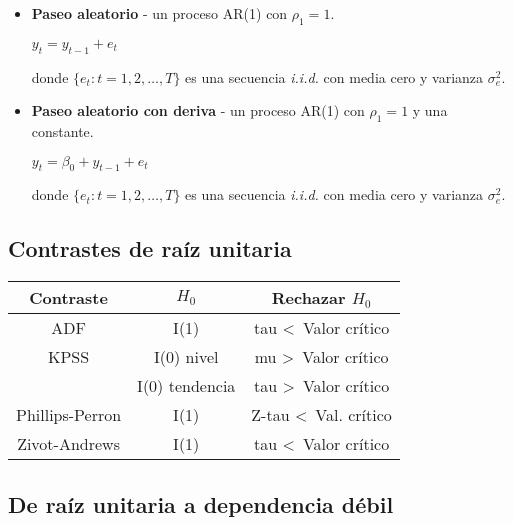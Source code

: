 \documentclass[10pt, a4paper, landscape]{article}
\begin{document}
\begin{multicols}{3}
		\begin{itemize}[leftmargin=*]
			\item \textbf{Paseo aleatorio} - un proceso AR(1) con $\rho_{1} = 1$.
			
			\begin{center}
				$y_{t} = y_{t - 1} + e_{t}$
			\end{center}
			
			donde $\lbrace e_{t} : t = 1, 2, \ldots, T \rbrace$ es una secuencia \textsl{i.i.d.} con media cero y varianza $\sigma^{2}_{e}$.
			
			\item \textbf{Paseo aleatorio con deriva} - un proceso AR(1) con $\rho_{1} = 1$ y una constante.
			
			\begin{center}
				$y_{t} = \beta_{0} + y_{t - 1} + e_{t}$
			\end{center}
			
			donde $\lbrace e_{t} : t = 1, 2, \ldots, T \rbrace$ es una secuencia \textsl{i.i.d.} con media cero y varianza $\sigma^{2}_{e}$.
		\end{itemize}
		
		\subsection*{Contrastes de raíz unitaria}
		
		\begin{center}
			\begin{tabular}{ c | c | c }
				Contraste       & $H_{0}$        & Rechazar $H_{0}$                  \\ \hline
				ADF             & I(1)           & tau \textless \, Valor crítico    \\ \hline
				KPSS            & I(0) nivel     & mu \textgreater \, Valor crítico  \\
				                & I(0) tendencia & tau \textgreater \, Valor crítico \\ \hline
				Phillips-Perron & I(1)           & Z-tau \textless \, Val. crítico   \\ \hline
				Zivot-Andrews   & I(1)           & tau \textless \, Valor crítico
			\end{tabular}
		\end{center}
		
		\subsection*{De raíz unitaria a dependencia débil}
		

\end{multicols}
\end{document}
